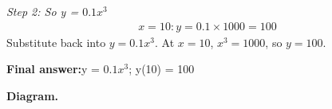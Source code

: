 \documentclass[11pt]{article}
\begin{document}
\textit{Step 2: So y = $0.1x^3$}
\[\begin{gathered}
x = 10: y = 0.1 \times 1000 = 100
\end{gathered}\]
Substitute back into \( y = 0.1x^{3} \). At \( x = 10 \), \( x^{3} = 1000 \), so \( y = 100 \).

\begin{answerbox}
\textbf{Final answer:}\quad y = $0.1x^3$; y(10) = 100
\end{answerbox}
\textbf{Diagram.}

\begin{center}
\end{center}
\end{document}
